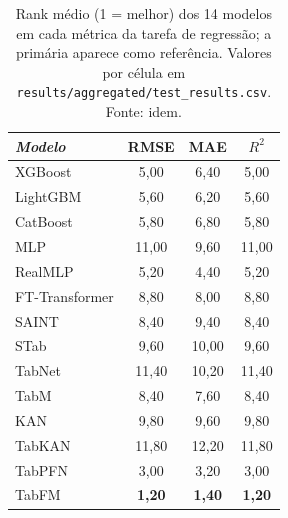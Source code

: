 \begin{table}[htbp]
\centering
\small
\caption[Métricas secundárias --- tarefa de regressão]{Rank médio (1 = melhor) dos 14 modelos em cada métrica da tarefa de regressão; a primária aparece como referência. Valores por célula em \texttt{results/\allowbreak aggregated/\allowbreak test\_\allowbreak results.\allowbreak csv}. Fonte: idem.}
\label{tab:app-secundarias-regression}
\begin{tabular}{lccc}
\toprule
\emph{Modelo} & RMSE & MAE & $R^{2}$ \\
\midrule
XGBoost & 5{,}00 & 6{,}40 & 5{,}00 \\
LightGBM & 5{,}60 & 6{,}20 & 5{,}60 \\
CatBoost & 5{,}80 & 6{,}80 & 5{,}80 \\
MLP & 11{,}00 & 9{,}60 & 11{,}00 \\
RealMLP & 5{,}20 & 4{,}40 & 5{,}20 \\
FT-Transformer & 8{,}80 & 8{,}00 & 8{,}80 \\
SAINT & 8{,}40 & 9{,}40 & 8{,}40 \\
STab & 9{,}60 & 10{,}00 & 9{,}60 \\
TabNet & 11{,}40 & 10{,}20 & 11{,}40 \\
TabM & 8{,}40 & 7{,}60 & 8{,}40 \\
KAN & 9{,}80 & 9{,}60 & 9{,}80 \\
TabKAN & 11{,}80 & 12{,}20 & 11{,}80 \\
TabPFN & 3{,}00 & 3{,}20 & 3{,}00 \\
TabFM & \textbf{1{,}20} & \textbf{1{,}40} & \textbf{1{,}20} \\
\bottomrule
\end{tabular}
\end{table}

